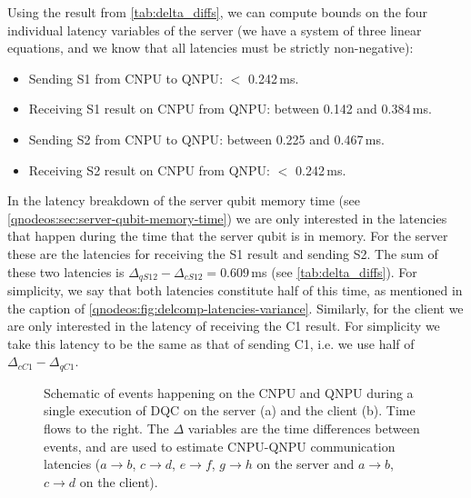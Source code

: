 Using the result from \cref{tab:delta_diffs}, we can compute bounds on the four individual latency variables of the server (we have a system of three linear equations, and we know that all latencies must be strictly non-negative):
%
\begin{itemize}
    \item Sending S1 from \ac{CNPU} to \ac{QNPU}: $<$ 0.242\,ms.
    \item Receiving S1 result on \ac{CNPU} from \ac{QNPU}: between 0.142 and 0.384\,ms.
    \item Sending S2 from \ac{CNPU} to \ac{QNPU}: between 0.225 and 0.467\,ms.
    \item Receiving S2 result on \ac{CNPU} from QNPU: $<$ 0.242\,ms.
\end{itemize}

In the latency breakdown of the server qubit memory time (see \cref{qnodeos:sec:server-qubit-memory-time}) we are only interested in the latencies that happen during the time that the server qubit is in memory. For the server these are the latencies for receiving the S1 result and sending S2. The sum of these two latencies is $\Delta_{qS12} - \Delta_{cS12} = 0.609$\,ms (see \cref{tab:delta_diffs}). For simplicity, we say that both latencies constitute half of this time, as mentioned in the caption of \cref{qnodeos:fig:delcomp-latencies-variance}. Similarly, for the client we are only interested in the latency of receiving the C1 result. For simplicity we take this latency to be the same as that of sending C1, i.e. we use half of $\Delta_{cC1} - \Delta_{qC1}$.

\begin{figure}[htbp]
    \centering
    \hfill
    \caption{Schematic of events happening on the \ac{CNPU} and \ac{QNPU} during a single execution of \ac{DQC} on the server (a) and the client (b). Time flows to the right. The $\Delta$ variables are the time differences between events, and are used to estimate \ac{CNPU}-\ac{QNPU} communication latencies ($a\rightarrow b$, $c\rightarrow d$, $e\rightarrow f$, $g\rightarrow h$ on the server and $a\rightarrow b$, $c\rightarrow d$ on the client).}
    \label{qnodeos:fig:cnpu_qnpu_latencies}%
\end{figure}

